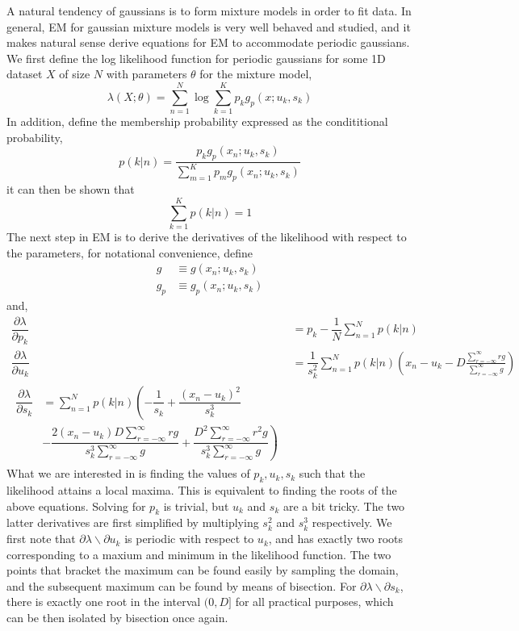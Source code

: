 \documentclass{acm_proc_article-sp}
\begin{document}
A natural tendency of gaussians is to form mixture models in order to fit data. In general, EM for gaussian mixture models is very well behaved and studied, and it makes natural sense derive equations for EM to accommodate periodic gaussians. We first define the log likelihood function for periodic gaussians for some 1D dataset \textbf{$X$} of size \textbf{$N$} with parameters \textbf{$\theta$} for the mixture model,
\begin{equation}
\lambda(X; \theta) = \sum_{n=1}^{N} \log \sum_{k=1}^{K} p_k g_p(x;u_k, s_k)
\end{equation}
In addition, define the membership probability expressed as the condititional probability,
\begin{equation}
p(k|n) = \dfrac{p_k g_p(x_n; u_k, s_k)}{\sum\limits^{K}_{m=1} p_m g_p(x_n; u_k, s_k)}
\end{equation}
it can then be shown that
\begin{equation}
\sum_{k=1}^{K} p(k|n) = 1
\end{equation}
The next step in EM is to derive the derivatives of the likelihood with respect to the parameters, for notational convenience, define
\begin{align}
g & \equiv g(x_n; u_k, s_k) \\
g_p & \equiv g_p(x_n; u_k, s_k)
\end{align}
and,
\begin{align}
\dfrac{\partial \lambda}{\partial p_k} & = p_k - \dfrac{1}{N} \sum\limits^{N}_{n=1}p(k|n) \\
\dfrac{\partial \lambda}{\partial u_k} &= \dfrac{1}{s_k^2} \sum_{n=1}^{N}p(k|n) \left(x_n - u_k - D \frac{\sum\limits^{\infty}_{r=-\infty} rg}{\sum\limits^{\infty}_{r=-\infty}g} \right) \\
\begin{split}
\dfrac{\partial \lambda}{\partial s_k} & = \sum\limits^{N}_{n=1}p(k|n) \left(-\dfrac{1}{s_k} + \dfrac{(x_n-u_k)^2}{s_k^3}\right. \\
&\left. -\dfrac{2(x_n-u_k)D\sum\limits^{\infty}_{r=-\infty}rg}{s_k^3 \sum\limits^{\infty}_{r=-\infty}g} + \dfrac{D^2 \sum\limits^{\infty}_{r=-\infty}r^2g}{s_k^3 \sum\limits^{\infty}_{r=-\infty}g} \right)
\end{split}
\end{align}
What we are interested in is finding the values of \textbf{$p_k, u_k, s_k$} such that the likelihood attains a local maxima. This is equivalent to finding the roots of the above equations. Solving for \(p_k\) is trivial, but \(u_k\) and \(s_k\) are a bit tricky.  The two latter derivatives are first simplified by multiplying \(s_k^2\) and \(s_k^3\) respectively. We first note that \(\partial \lambda \backslash \partial u_k \) is periodic with respect to \(u_k\), and has exactly two roots corresponding to a  maxium  and minimum in the likelihood function. The two points that bracket the maximum can be found easily by sampling the domain, and the subsequent maximum can be found by means of bisection. For \(\partial \lambda \backslash \partial s_k\), there is exactly one root in the interval \((0, D]\) for all practical purposes, which can be then isolated by bisection once again.
\end{document}
